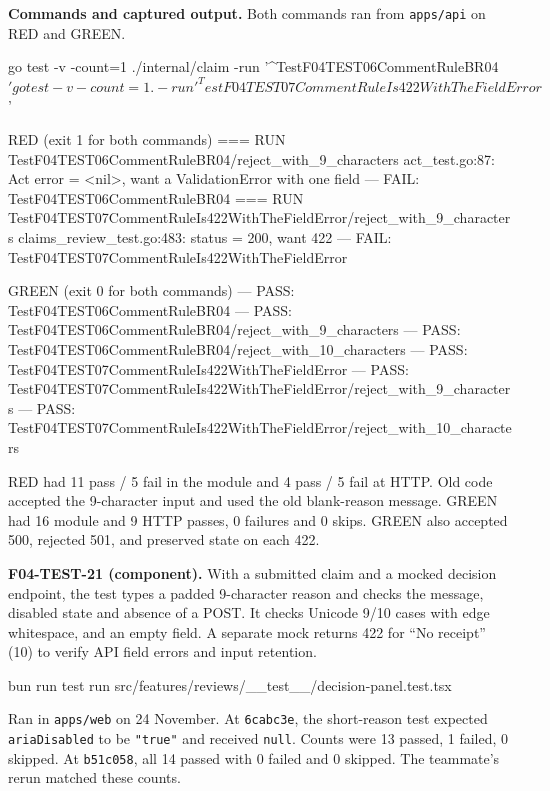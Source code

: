 \textbf{Commands and captured output.}
Both commands ran from \texttt{apps/api} on RED and GREEN.
\begin{record}
go test -v -count=1 ./internal/claim -run '^TestF04TEST06CommentRuleBR04$'
go test -v -count=1 . -run '^TestF04TEST07CommentRuleIs422WithTheFieldError$'
\end{record}
\begin{record}
RED (exit 1 for both commands)
=== RUN   TestF04TEST06CommentRuleBR04/reject_with_9_characters
    act_test.go:87: Act error = <nil>, want a ValidationError with one field
--- FAIL: TestF04TEST06CommentRuleBR04
=== RUN   TestF04TEST07CommentRuleIs422WithTheFieldError/reject_with_9_characters
    claims_review_test.go:483: status = 200, want 422
--- FAIL: TestF04TEST07CommentRuleIs422WithTheFieldError

GREEN (exit 0 for both commands)
--- PASS: TestF04TEST06CommentRuleBR04
    --- PASS: TestF04TEST06CommentRuleBR04/reject_with_9_characters
    --- PASS: TestF04TEST06CommentRuleBR04/reject_with_10_characters
--- PASS: TestF04TEST07CommentRuleIs422WithTheFieldError
    --- PASS: TestF04TEST07CommentRuleIs422WithTheFieldError/reject_with_9_characters
    --- PASS: TestF04TEST07CommentRuleIs422WithTheFieldError/reject_with_10_characters
\end{record}
RED had 11 pass / 5 fail in the module and 4 pass / 5 fail at HTTP. Old code accepted the 9-character input and used the old blank-reason message. GREEN had 16 module and 9 HTTP passes, 0 failures and 0 skips. GREEN also accepted 500, rejected 501, and preserved state on each 422.

\clearpage
{}
\label{ev:web}
\textbf{F04-TEST-21 (component).}
With a submitted claim and a mocked decision endpoint, the test types a padded 9-character reason and checks the message, disabled state and absence of a POST. It checks Unicode 9/10 cases with edge whitespace, and an empty field. A separate mock returns 422 for “No receipt” (10) to verify API field errors and input retention.
\begin{record}
bun run test run src/features/reviews/__test__/decision-panel.test.tsx
\end{record}
Ran in \texttt{apps/web} on 24 November. At \texttt{6cabc3e}, the short-reason test expected \texttt{ariaDisabled} to be \texttt{"true"} and received \texttt{null}. Counts were 13 passed, 1 failed, 0 skipped. At \texttt{b51c058}, all 14 passed with 0 failed and 0 skipped. The teammate's rerun matched these counts.

